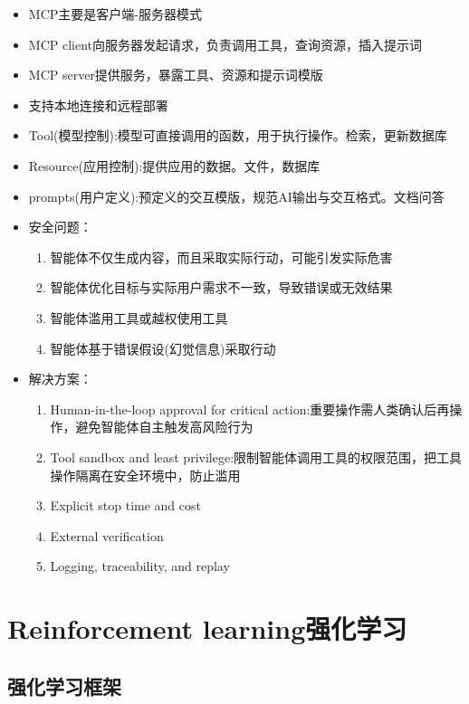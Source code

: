 \documentclass[UTF8]{ctexart}
\begin{document}
\begin{itemize}
    \item MCP主要是客户端-服务器模式
    \item MCP client向服务器发起请求，负责调用工具，查询资源，插入提示词
    \item MCP server提供服务，暴露工具、资源和提示词模版
    \item 支持本地连接和远程部署
    \item Tool(模型控制):模型可直接调用的函数，用于执行操作。检索，更新数据库
    \item Resource(应用控制):提供应用的数据。文件，数据库
    \item prompts(用户定义):预定义的交互模版，规范AI输出与交互格式。文档问答
    \item 安全问题：
    \begin{enumerate}
        \item 智能体不仅生成内容，而且采取实际行动，可能引发实际危害
        \item 智能体优化目标与实际用户需求不一致，导致错误或无效结果
        \item 智能体滥用工具或越权使用工具
        \item 智能体基于错误假设(幻觉信息)采取行动
    \end{enumerate}
    \item 解决方案：
    \begin{enumerate}
        \item Human-in-the-loop approval for critical action:重要操作需人类确认后再操作，避免智能体自主触发高风险行为
        \item Tool sandbox and least privilege:限制智能体调用工具的权限范围，把工具操作隔离在安全环境中，防止滥用
        \item Explicit stop time and cost
        \item External verification
        \item Logging, traceability, and replay
    \end{enumerate}
\end{itemize}


\section{Reinforcement learning强化学习}

\subsection{强化学习框架}
\end{document}
